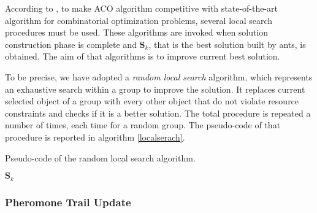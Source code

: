 \documentclass[12pt,a4paper]{report}
\begin{document}
According to \cite{}, to make ACO algorithm competitive with  state-of-the-art algorithm for combinatorial optimization problems, several local search procedures must be used. These algorithms are invoked when solution construction phase is complete and $\textbf{S}_k$, that is the best solution built by ants, is obtained. The aim of that algorithms is to improve current best solution.

To be precise, we have adopted a \textit{random local search} algorithm, which represents an exhaustive search within a group to improve the solution. It replaces current selected object of a group with every other object that do not violate resource constraints and checks if it is a better solution. The total procedure is repeated a number of times, each time for a random group. The pseudo-code of that procedure is reported in algorithm \ref{localserach}.
	

\begin{algorithm}\label{localserach}
	\caption{Pseudo-code of the random local search algorithm.}
	
	\Return $\textbf{S}_k$
\end{algorithm}

\subsubsection{Pheromone Trail Update}
\end{document}
